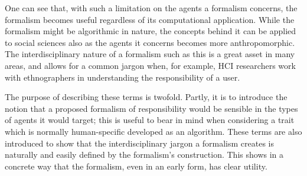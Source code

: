 One can see that, with such a limitation on the agents a formalism concerns, the formalism becomes useful regardless of its computational application. While the formalism might be algorithmic in nature, the concepts behind it can be applied to social sciences also as the agents it concerns becomes more anthropomorphic. The interdisciplinary nature of a formalism such as this is a great asset in many areas, and allows for a common jargon when, for example, HCI researchers work with ethnographers in understanding the responsibility of a user.\par

The purpose of describing these terms is twofold. Partly, it is to introduce the notion that a proposed formalism of responsibility would be sensible in the types of agents it would target; this is useful to bear in mind when considering a trait which is normally human-specific developed as an algorithm. These terms are also introduced to show that the interdisciplinary jargon a formalism creates is naturally and easily defined by the formalism's construction. This shows in a concrete way that the formalism, even in an early form, has clear utility.\par

